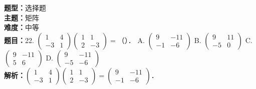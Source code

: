 \documentclass{ctexart}
\newenvironment{question}[5]{%
	\noindent\textbf{题型：}#1\\
	\textbf{主题：}#2\\
	\textbf{难度：}#3\\
	\textbf{题目：}#4\\
	\textbf{解析：}#5\\
	\vspace{1em}
}{}
\begin{document}
	\begin{question}
		{选择题}
		{矩阵}
		{中等}
		{22. \(\left(\begin{array}{cc}1 & 4 \\ -3 & 1\end{array}\right)\left(\begin{array}{cc}1 & 1 \\ 2 & -3\end{array}\right)=\)（）．
			A. \(\left(\begin{array}{cc}9 & -11 \\ -1 & -6\end{array}\right)\)
			B. \(\left(\begin{array}{cc}9 & 11 \\ -5 & 0\end{array}\right)\)
			C. \(\left(\begin{array}{cc}9 & -11 \\ 5 & 6\end{array}\right)\)
			D. \(\left(\begin{array}{cc}9 & -11 \\ -5 & -6\end{array}\right)\)}
		{\(\left(\begin{array}{cc}1 & 4 \\ -3 & 1\end{array}\right)\left(\begin{array}{cc}1 & 1 \\ 2 & -3\end{array}\right)=\left(\begin{array}{cc}9 & -11 \\ -1 & -6\end{array}\right)\)．}
	\end{question}
	
\end{document}
